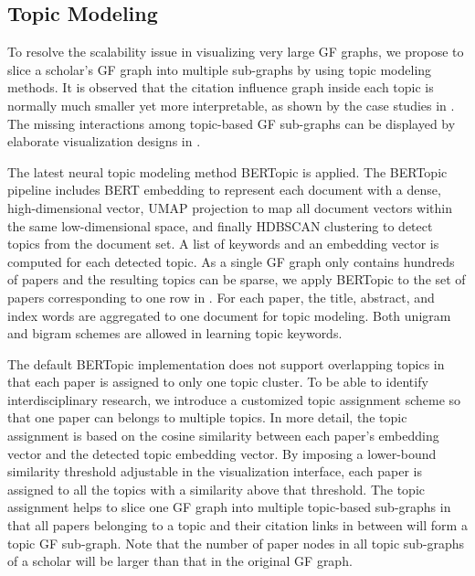 


\subsection{Topic Modeling}


To resolve the scalability issue in visualizing very large GF graphs, we propose to slice a scholar's GF graph into multiple sub-graphs by using topic modeling methods. It is observed that the citation influence graph inside each topic is normally much smaller yet more interpretable, as shown by the case studies in . The missing interactions among topic-based GF sub-graphs can be displayed by elaborate visualization designs in .


The latest neural topic modeling method BERTopic \cite{BERTopic} is applied. The BERTopic pipeline includes BERT embedding to represent each document with a dense, high-dimensional vector, UMAP projection \cite{UMAP} to map all document vectors within the same low-dimensional space, and finally HDBSCAN clustering \cite{HDBSCAN} to detect topics from the document set. A list of keywords and an embedding vector is computed for each detected topic. As a single GF graph only contains hundreds of papers and the resulting topics can be sparse, we apply BERTopic to the set of papers corresponding to one row in . For each paper, the title, abstract, and index words are aggregated to one document for topic modeling. Both unigram and bigram schemes are allowed in learning topic keywords.


The default BERTopic implementation does not support overlapping topics in that each paper is assigned to only one topic cluster. To be able to identify interdisciplinary research, we introduce a customized topic assignment scheme so that one paper can belongs to multiple topics. In more detail, the topic assignment is based on the cosine similarity between each paper's embedding vector and the detected topic embedding vector. By imposing a lower-bound similarity threshold adjustable in the visualization interface, each paper is assigned to all the topics with a similarity above that threshold. The topic assignment helps to slice one GF graph into multiple topic-based sub-graphs in that all papers belonging to a topic and their citation links in between will form a topic GF sub-graph. Note that the number of paper nodes in all topic sub-graphs of a scholar will be larger than that in the original GF graph.

